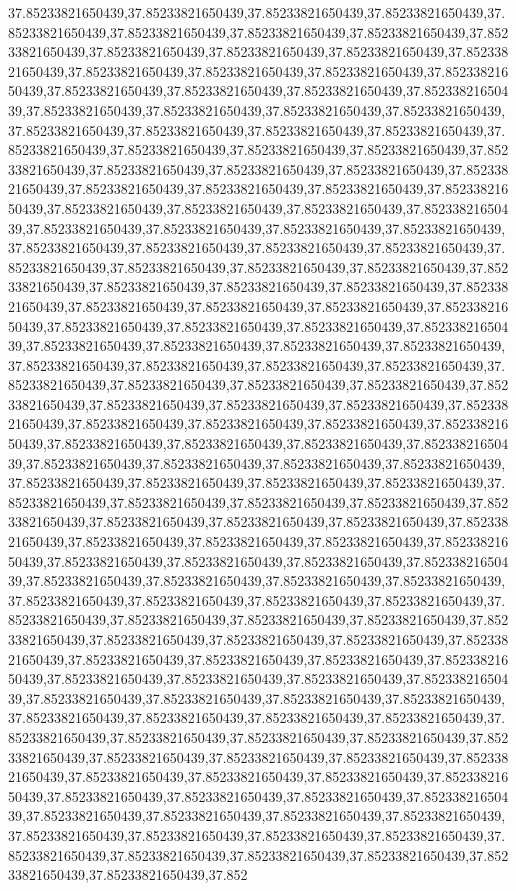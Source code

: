 37.85233821650439,37.85233821650439,37.85233821650439,37.85233821650439,37.85233821650439,37.85233821650439,37.85233821650439,37.85233821650439,37.85233821650439,37.85233821650439,37.85233821650439,37.85233821650439,37.85233821650439,37.85233821650439,37.85233821650439,37.85233821650439,37.85233821650439,37.85233821650439,37.85233821650439,37.85233821650439,37.85233821650439,37.85233821650439,37.85233821650439,37.85233821650439,37.85233821650439,37.85233821650439,37.85233821650439,37.85233821650439,37.85233821650439,37.85233821650439,37.85233821650439,37.85233821650439,37.85233821650439,37.85233821650439,37.85233821650439,37.85233821650439,37.85233821650439,37.85233821650439,37.85233821650439,37.85233821650439,37.85233821650439,37.85233821650439,37.85233821650439,37.85233821650439,37.85233821650439,37.85233821650439,37.85233821650439,37.85233821650439,37.85233821650439,37.85233821650439,37.85233821650439,37.85233821650439,37.85233821650439,37.85233821650439,37.85233821650439,37.85233821650439,37.85233821650439,37.85233821650439,37.85233821650439,37.85233821650439,37.85233821650439,37.85233821650439,37.85233821650439,37.85233821650439,37.85233821650439,37.85233821650439,37.85233821650439,37.85233821650439,37.85233821650439,37.85233821650439,37.85233821650439,37.85233821650439,37.85233821650439,37.85233821650439,37.85233821650439,37.85233821650439,37.85233821650439,37.85233821650439,37.85233821650439,37.85233821650439,37.85233821650439,37.85233821650439,37.85233821650439,37.85233821650439,37.85233821650439,37.85233821650439,37.85233821650439,37.85233821650439,37.85233821650439,37.85233821650439,37.85233821650439,37.85233821650439,37.85233821650439,37.85233821650439,37.85233821650439,37.85233821650439,37.85233821650439,37.85233821650439,37.85233821650439,37.85233821650439,37.85233821650439,37.85233821650439,37.85233821650439,37.85233821650439,37.85233821650439,37.85233821650439,37.85233821650439,37.85233821650439,37.85233821650439,37.85233821650439,37.85233821650439,37.85233821650439,37.85233821650439,37.85233821650439,37.85233821650439,37.85233821650439,37.85233821650439,37.85233821650439,37.85233821650439,37.85233821650439,37.85233821650439,37.85233821650439,37.85233821650439,37.85233821650439,37.85233821650439,37.85233821650439,37.85233821650439,37.85233821650439,37.85233821650439,37.85233821650439,37.85233821650439,37.85233821650439,37.85233821650439,37.85233821650439,37.85233821650439,37.85233821650439,37.85233821650439,37.85233821650439,37.85233821650439,37.85233821650439,37.85233821650439,37.85233821650439,37.85233821650439,37.85233821650439,37.85233821650439,37.85233821650439,37.85233821650439,37.85233821650439,37.85233821650439,37.85233821650439,37.85233821650439,37.85233821650439,37.85233821650439,37.85233821650439,37.85233821650439,37.85233821650439,37.85233821650439,37.85233821650439,37.85233821650439,37.85233821650439,37.85233821650439,37.85233821650439,37.85233821650439,37.85233821650439,37.85233821650439,37.85233821650439,37.85233821650439,37.85233821650439,37.85233821650439,37.85233821650439,37.85233821650439,37.85233821650439,37.85233821650439,37.85233821650439,37.85233821650439,37.85233821650439,37.85233821650439,37.85233821650439,37.85233821650439,37.85233821650439,37.85233821650439,37.85233821650439,37.85233821650439,37.85233821650439,37.85233821650439,37.852